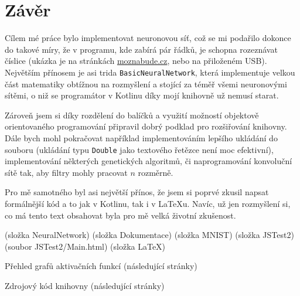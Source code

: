 \documentclass[12pt]{report}			%
\newcommand{\glsref}[1]{\glsdisp{#1}{\phantom{}}}
\begin{document}
	\appendix
	
	\chapter*{Závěr}
	
		Cílem mé práce bylo implementovat neuronovou síť, což se mi podařilo dokonce do takové míry, že v programu, kde zabírá pár řádků, je schopna rozeznávat číslice (ukázka je na stránkách \url{moznabude.cz}, nebo na přiloženém USB). Největším přínosem je asi \gls{trida} \verb!BasicNeuralNetwork!, která implementuje velkou část matematiky obtížnou na rozmyšlení a stojící za téměř všemi neuronovými sítěmi, o niž se programátor v \gls{Kotlin}u díky mojí knihovně už nemusí starat.
		
		Zároveň jsem si díky rozdělení do balíčků a využití možností objektově orientovaného programování připravil dobrý podklad pro rozšiřování knihovny. Dále bych mohl pokračovat například implementováním lepšího ukládání do souboru (ukládání \gls{typ}u \glsref{Double}\verb!Double! jako textového řetězce není moc efektivní), implementování některých genetických algoritmů, či naprogramování konvoluční sítě tak, aby filtry mohly pracovat $n$ rozměrně.
		
		Pro mě samotného byl asi největší přínos, že jsem si poprvé zkusil napsat formálnější kód a to jak v \gls{Kotlin}u, tak i v LaTeXu. Navíc, už jen rozmyšlení si, co má tento text obsahovat byla pro mě velká životní zkušenost.
	
	\nocite{*}
    \printglossary[title={Slovníček pojmů}]	%
    \printbibliography					%
    \listoffigures						%
    
    \begin{prilohy}
    	 (složka NeuralNetwork)
    	 (složka Dokumentace)
    	 (složka MNIST)
    	 (složka JSTest2)
    	 (soubor JSTest2/Main.html)
    	 (složka LaTeX)
    	\item{Přehled grafů aktivačních funkcí} (následující stránky)
    	\item{Zdrojový kód knihovny} (následující stránky)
    \end{prilohy}  
    
\end{document}
